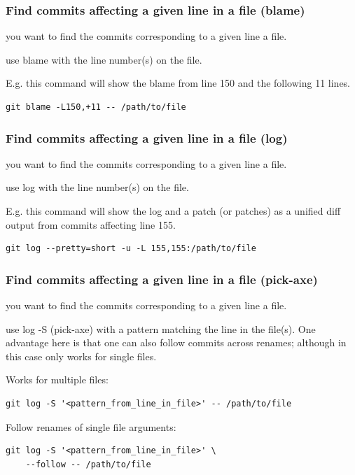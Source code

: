 \documentclass{git_course}
\begin{document}
\begin{frame}[fragile]
    \frametitle{Find commits affecting a given line in a file (blame)}

     you want to find the commits corresponding to a given
    line a file.

     use blame with the line number(s) on the file.

E.g. this command will show the blame from line 150 and the following 11 lines.
\begin{lstlisting}
git blame -L150,+11 -- /path/to/file
\end{lstlisting}

\end{frame}

\begin{frame}[fragile]
    \frametitle{Find commits affecting a given line in a file (log)}

     you want to find the commits corresponding to a given
    line a file.

     use log with the line number(s) on the file.

    E.g. this command will show the log and a patch (or patches) as a unified diff
    output from commits affecting line 155.
\begin{lstlisting}
git log --pretty=short -u -L 155,155:/path/to/file
\end{lstlisting}

\end{frame}

\begin{frame}[fragile]
    \frametitle{Find commits affecting a given line in a file (pick-axe)}

     you want to find the commits corresponding to a given
    line a file.

     use log -S (pick-axe) with a pattern matching the line
    in the file(s).  One advantage here is that one can also follow commits
    across renames; although in this case only works for single files.

Works for multiple files:
\begin{lstlisting}
git log -S '<pattern_from_line_in_file>' -- /path/to/file
\end{lstlisting}

Follow renames of single file arguments:
\begin{lstlisting}
git log -S '<pattern_from_line_in_file>' \
    --follow -- /path/to/file
\end{lstlisting}

\end{frame}
\end{document}

